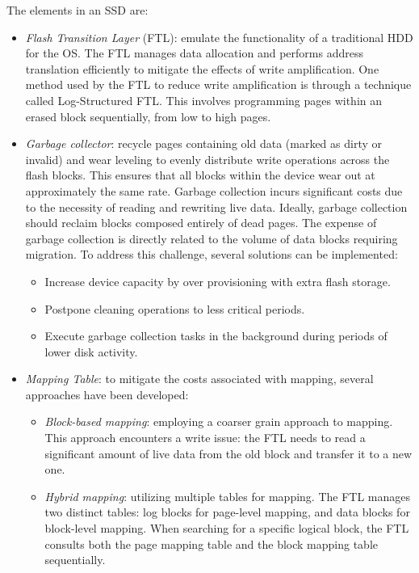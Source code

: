 The elements in an SSD are: 
\begin{itemize}
    \item \textit{Flash Transition Layer} (FTL): emulate the functionality of a traditional HDD for the OS. 
        The FTL manages data allocation and performs address translation efficiently to mitigate the effects of write amplification.
        One method used by the FTL to reduce write amplification is through a technique called Log-Structured FTL. 
        This involves programming pages within an erased block sequentially, from low to high pages.
    \item \textit{Garbage collector}: recycle pages containing old data (marked as dirty or invalid) and wear leveling to evenly distribute write operations across the flash blocks. 
        This ensures that all blocks within the device wear out at approximately the same rate.
        Garbage collection incurs significant costs due to the necessity of reading and rewriting live data. 
        Ideally, garbage collection should reclaim blocks composed entirely of dead pages. 
        The expense of garbage collection is directly related to the volume of data blocks requiring migration. 
        To address this challenge, several solutions can be implemented:
        \begin{itemize}
            \item Increase device capacity by over provisioning with extra flash storage.
            \item Postpone cleaning operations to less critical periods.
            \item Execute garbage collection tasks in the background during periods of lower disk activity.
        \end{itemize}
    \item \textit{Mapping Table}: to mitigate the costs associated with mapping, several approaches have been developed:
        \begin{itemize}
            \item \textit{Block-based mapping}: employing a coarser grain approach to mapping.
                This approach encounters a write issue: the FTL needs to read a significant amount of live data from the old block and transfer it to a new one.
            \item \textit{Hybrid mapping}: utilizing multiple tables for mapping.
                The FTL manages two distinct tables: log blocks for page-level mapping, and data blocks for block-level mapping.
                When searching for a specific logical block, the FTL consults both the page mapping table and the block mapping table sequentially.

\end{itemize}
\end{itemize}
